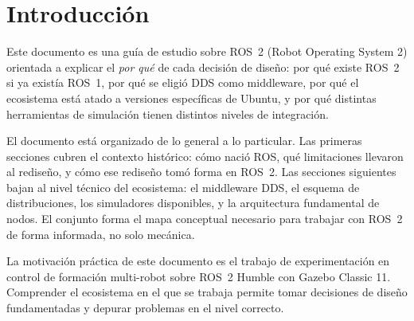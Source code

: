 \section{Introducción}

Este documento es una guía de estudio sobre ROS~2 (Robot Operating System 2) orientada a explicar el \textit{por qué} de cada decisión de diseño: por qué existe ROS~2 si ya existía ROS~1, por qué se eligió DDS como middleware, por qué el ecosistema está atado a versiones específicas de Ubuntu, y por qué distintas herramientas de simulación tienen distintos niveles de integración.

El documento está organizado de lo general a lo particular. Las primeras secciones cubren el contexto histórico: cómo nació ROS, qué limitaciones llevaron al rediseño, y cómo ese rediseño tomó forma en ROS~2. Las secciones siguientes bajan al nivel técnico del ecosistema: el middleware DDS, el esquema de distribuciones, los simuladores disponibles, y la arquitectura fundamental de nodos. El conjunto forma el mapa conceptual necesario para trabajar con ROS~2 de forma informada, no solo mecánica.

La motivación práctica de este documento es el trabajo de experimentación en control de formación multi-robot sobre ROS~2 Humble con Gazebo Classic 11. Comprender el ecosistema en el que se trabaja permite tomar decisiones de diseño fundamentadas y depurar problemas en el nivel correcto.
